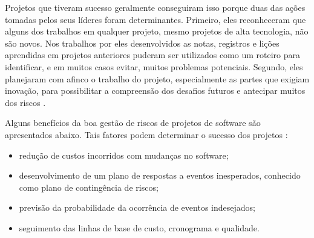 Projetos que tiveram sucesso geralmente conseguiram isso porque duas das ações tomadas pelos seus líderes foram determinantes. Primeiro, eles reconheceram que alguns dos trabalhos em qualquer projeto, mesmo projetos de alta tecnologia, não são novos. Nos trabalhos por eles desenvolvidos as notas, registros e lições aprendidas em projetos anteriores puderam ser utilizados como um roteiro para identificar, e em muitos casos evitar, muitos problemas potenciais. Segundo, eles planejaram com afinco o trabalho do projeto, especialmente as partes que exigiam inovação, para possibilitar a compreensão dos desafios futuros e antecipar muitos dos riscos \cite{kendrick2003identifying}.

Alguns benefícios da boa gestão de riscos de projetos de software são apresentados abaixo. Tais fatores podem determinar o sucesso dos projetos \cite{HIGUERAHAIMES1996} \cite{PMBOK2008}:

\begin{itemize}
\item redução de custos incorridos com mudanças no software;
\item desenvolvimento de um plano de respostas a eventos inesperados, conhecido como plano de contingência de riscos;
\item previsão da probabilidade da ocorrência de eventos indesejados;
\item seguimento das linhas de base de custo, cronograma e qualidade.
\end{itemize}

